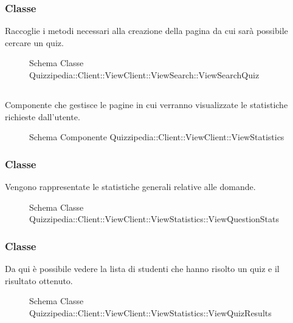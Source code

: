 \subsubsection{Classe }
Raccoglie i metodi necessari alla creazione della pagina da cui sarà possibile cercare un quiz.
\begin{figure}[H]
\centering
\noindent{}
\caption[Schema Classe ViewSearchQuiz]{Schema Classe Quizzipedia::Client::ViewClient::ViewSearch::ViewSearchQuiz}
\end{figure}
\subsection{}
Componente che gestisce le pagine in cui verranno visualizzate le statistiche richieste dall'utente.
\begin{figure}[H]
\centering
\noindent{}
\caption[Schema Componente Quizzipedia::Client::ViewClient::ViewStatistics]{Schema Componente Quizzipedia::Client::ViewClient::ViewStatistics}
\end{figure}
\subsubsection{Classe }
Vengono rappresentate le statistiche generali relative alle domande.
\begin{figure}[H]
\centering
\noindent{}
\caption[Schema Classe ViewQuestionStats]{Schema Classe Quizzipedia::Client::ViewClient::ViewStatistics::ViewQuestionStats}
\end{figure}
\subsubsection{Classe }
Da qui è possibile vedere la lista di studenti che hanno risolto un quiz e il risultato ottenuto.
\begin{figure}[H]
\centering
\noindent{}
\caption[Schema Classe ViewQuizResults]{Schema Classe Quizzipedia::Client::ViewClient::ViewStatistics::ViewQuizResults}
\end{figure}
